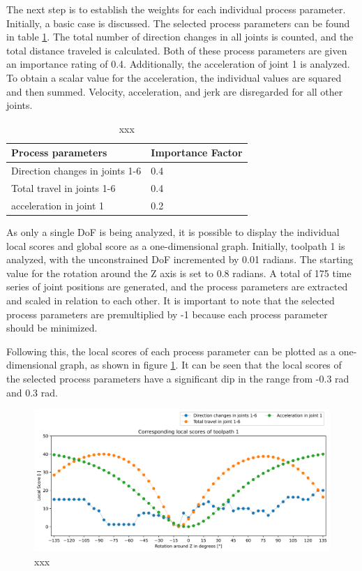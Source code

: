 The next step is to establish the weights for each individual process parameter. Initially, a basic case is discussed. The selected process parameters can be found in table \ref{PPbasic}. The total number of direction changes in all joints is counted, and the total distance traveled is calculated. Both of these process parameters are given an importance rating of 0.4. Additionally, the acceleration of joint 1 is analyzed. To obtain a scalar value for the acceleration, the individual values are squared and then summed. Velocity, acceleration, and jerk are disregarded for all other joints.

\begin{table}[H]
	\centering
	\begin{tabular}{||l|l||}
		Process parameters& Importance Factor \\
		\hline
		\hline
		\hline
		Direction changes in joints 1-6	&		0.4 \\
		Total travel in joints 1-6	&  	0.4 \\
		acceleration in joint 1	& 		0.2\\
		
		\hline
		\hline
	\end{tabular}
	
	\caption{xxx}
	\label{PPbasic}
\end{table}


As only a single DoF is being analyzed, it is possible to display the individual local scores and global score as a one-dimensional graph. Initially, toolpath 1 is analyzed, with the unconstrained DoF incremented by 0.01 radians. The starting value for the rotation around the Z axis is set to 0.8 radians. A total of 175 time series of joint positions are generated, and the process parameters are extracted and scaled in relation to each other. It is important to note that the selected process parameters are premultiplied by -1 because each process parameter should be minimized.

Following this, the local scores of each process parameter can be plotted as a one-dimensional graph, as shown in figure \ref{LS1}. It can be seen that the local scores of the selected process parameters have a significant dip in the range from -0.3 rad and 0.3 rad.

\begin{figure}[H]
	\centerline{\includegraphics[width=1\textwidth]{figures/LocalScores_1.png}}
	\caption{xxx}
	\label{LS1}
\end{figure}


